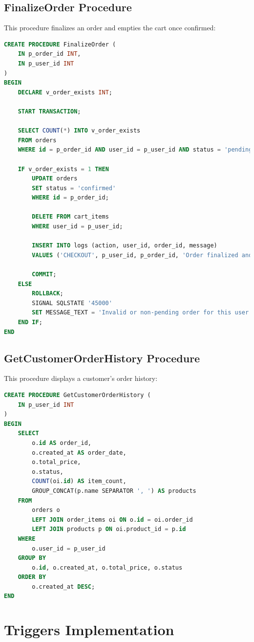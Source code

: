 \documentclass{article}
\begin{document}
\subsection{FinalizeOrder Procedure}
This procedure finalizes an order and empties the cart once confirmed:

\begin{lstlisting}[language=SQL]
CREATE PROCEDURE FinalizeOrder (
    IN p_order_id INT,
    IN p_user_id INT
)
BEGIN
    DECLARE v_order_exists INT;

    START TRANSACTION;

    SELECT COUNT(*) INTO v_order_exists
    FROM orders
    WHERE id = p_order_id AND user_id = p_user_id AND status = 'pending';

    IF v_order_exists = 1 THEN
        UPDATE orders
        SET status = 'confirmed'
        WHERE id = p_order_id;

        DELETE FROM cart_items
        WHERE user_id = p_user_id;

        INSERT INTO logs (action, user_id, order_id, message)
        VALUES ('CHECKOUT', p_user_id, p_order_id, 'Order finalized and cart emptied');

        COMMIT;
    ELSE
        ROLLBACK;
        SIGNAL SQLSTATE '45000'
        SET MESSAGE_TEXT = 'Invalid or non-pending order for this user';
    END IF;
END
\end{lstlisting}

\subsection{GetCustomerOrderHistory Procedure}
This procedure displays a customer's order history:

\begin{lstlisting}[language=SQL]
CREATE PROCEDURE GetCustomerOrderHistory (
    IN p_user_id INT
)
BEGIN
    SELECT
        o.id AS order_id,
        o.created_at AS order_date,
        o.total_price,
        o.status,
        COUNT(oi.id) AS item_count,
        GROUP_CONCAT(p.name SEPARATOR ', ') AS products
    FROM
        orders o
        LEFT JOIN order_items oi ON o.id = oi.order_id
        LEFT JOIN products p ON oi.product_id = p.id
    WHERE
        o.user_id = p_user_id
    GROUP BY
        o.id, o.created_at, o.total_price, o.status
    ORDER BY
        o.created_at DESC;
END
\end{lstlisting}

\section{Triggers Implementation}
\end{document}
